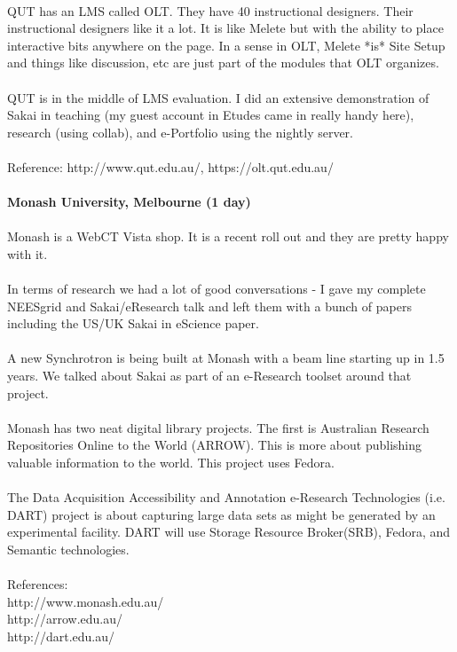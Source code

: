 \documentclass[12pt]{book}
\begin{document}
\\
QUT has an LMS called OLT.   They have 40 instructional designers.   Their instructional designers like it a lot.   It is like Melete but with the ability to place interactive bits anywhere on the page.   In a sense in OLT, Melete *is* Site Setup and things like discussion, etc are just part of the modules that OLT organizes.\\
\\
QUT is in the middle of LMS evaluation. I did an extensive demonstration of Sakai in teaching (my guest account in Etudes came in really handy here), research (using collab), and e-Portfolio using the nightly server.   \\
\\
Reference: http://www.qut.edu.au/, https://olt.qut.edu.au/\\
\\
{\bf Monash University, Melbourne (1 day)}\\
\\
Monash is a WebCT Vista shop.   It is a recent roll out and they are pretty happy with it.\\
\\
In terms of research we had a lot of good conversations - I gave my complete NEESgrid and Sakai\slash eResearch talk and left them with a bunch of papers including the US/UK Sakai in eScience paper.\\
\\
A new Synchrotron is being built at Monash with a beam line starting up in 1.5 years.   We talked about Sakai as part of an e-Research toolset around that project.\\
\\
Monash has two neat digital library projects.   The first is   Australian Research Repositories Online to the World (ARROW).   This is more about publishing valuable information to the world.   This project uses Fedora.\\
\\
The Data Acquisition Accessibility and Annotation e-Research Technologies (i.e. DART) project is about capturing large data sets as might be generated by an experimental facility.    DART will use Storage Resource Broker(SRB), Fedora, and Semantic technologies.   \\
\\
References:\\
http://www.monash.edu.au/\\
http://arrow.edu.au/\\
http://dart.edu.au/\\
\end{document}
